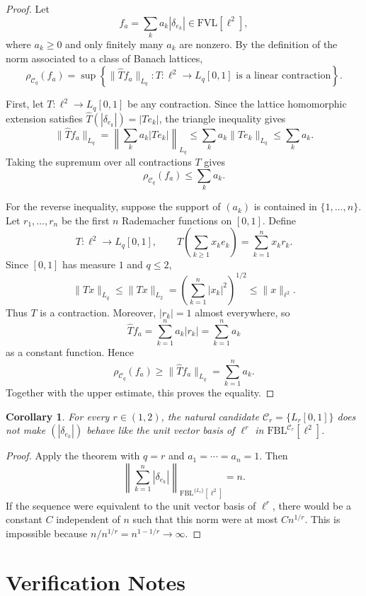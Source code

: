 \documentclass[11pt]{article}
\newtheorem{corollary}{Corollary}
\newcommand{\FBL}{\mathrm{FBL}}
\newcommand{\FVL}{\mathrm{FVL}}
\newcommand{\elltwo}{\ell^2}
\newcommand{\calC}{\mathcal C}
\begin{document}
\begin{proof}
Let
\[
f_a=\sum_k a_k |\delta_{e_k}|\in \FVL[\elltwo],
\]
where \(a_k\ge 0\) and only finitely many \(a_k\) are nonzero. By the
definition of the norm associated to a class of Banach lattices,
\[
\rho_{\calC_q}(f_a)
=\sup\left\{\|\widehat T f_a\|_{L_q}: T:\elltwo\to L_q[0,1]
\text{ is a linear contraction}\right\}.
\]

First, let \(T:\elltwo\to L_q[0,1]\) be any contraction. Since the
lattice homomorphic extension satisfies
\(\widehat T(|\delta_{e_k}|)=|T e_k|\), the triangle inequality gives
\[
\|\widehat T f_a\|_{L_q}
=\left\|\sum_k a_k |T e_k|\right\|_{L_q}
\le \sum_k a_k\|T e_k\|_{L_q}
\le \sum_k a_k.
\]
Taking the supremum over all contractions \(T\) gives
\[
\rho_{\calC_q}(f_a)\le \sum_k a_k.
\]

For the reverse inequality, suppose the support of \((a_k)\) is contained
in \(\{1,\dots,n\}\). Let \(r_1,\dots,r_n\) be the first \(n\) Rademacher
functions on \([0,1]\). Define
\[
T:\elltwo\to L_q[0,1],
\qquad
T\left(\sum_{k\ge 1} x_k e_k\right)=\sum_{k=1}^n x_k r_k .
\]
Since \([0,1]\) has measure \(1\) and \(q\le 2\),
\[
\|Tx\|_{L_q}\le \|Tx\|_{L_2}
=\left(\sum_{k=1}^n |x_k|^2\right)^{1/2}
\le \|x\|_{\elltwo}.
\]
Thus \(T\) is a contraction. Moreover, \(|r_k|=1\) almost everywhere, so
\[
\widehat T f_a
=\sum_{k=1}^n a_k |r_k|
=\sum_{k=1}^n a_k
\]
as a constant function. Hence
\[
\rho_{\calC_q}(f_a)
\ge \|\widehat T f_a\|_{L_q}
=\sum_{k=1}^n a_k.
\]
Together with the upper estimate, this proves the equality.
\end{proof}

\begin{corollary}
For every \(r\in(1,2)\), the natural candidate
\(\calC_r=\{L_r[0,1]\}\) does not make \((|\delta_{e_k}|)\) behave like
the unit vector basis of \(\ell^r\) in
\(\FBL^{\calC_r}[\elltwo]\).
\end{corollary}

\begin{proof}
Apply the theorem with \(q=r\) and \(a_1=\cdots=a_n=1\). Then
\[
\left\|\sum_{k=1}^n |\delta_{e_k}|\right\|_{\FBL^{\{L_r\}}[\elltwo]}
=n.
\]
If the sequence were equivalent to the unit vector basis of \(\ell^r\),
there would be a constant \(C\) independent of \(n\) such that this norm
were at most \(C n^{1/r}\). This is impossible because
\(n/n^{1/r}=n^{1-1/r}\to\infty\).
\end{proof}

\section*{Verification Notes}
\end{document}

